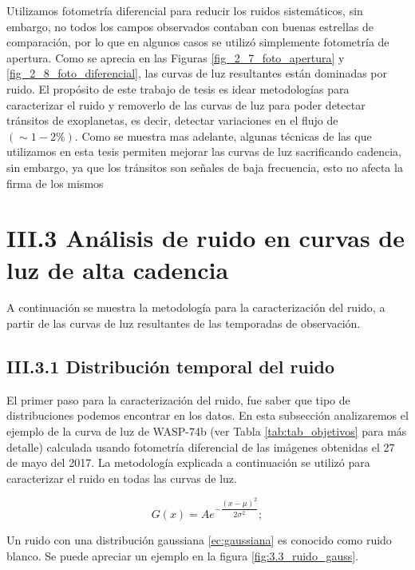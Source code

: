 Utilizamos fotometría diferencial para reducir los ruidos sistemáticos, sin embargo, no todos los campos observados contaban con buenas estrellas de comparación, por lo que en algunos casos se utilizó simplemente fotometría de apertura. Como se aprecia en las Figuras \ref{fig_2_7_foto_apertura} y \ref{fig_2_8_foto_diferencial}, las curvas de luz resultantes están dominadas por ruido. El propósito de este trabajo de tesis es idear metodologías para caracterizar el ruido y removerlo de las curvas de luz para poder detectar tránsitos de exoplanetas, es decir, detectar variaciones en el flujo de $(\sim 1-2 \%)$. Como se muestra mas adelante, algunas técnicas de las que utilizamos en esta tesis permiten mejorar las curvas de luz sacrificando cadencia, sin embargo, ya que los tránsitos son señales de baja frecuencia, esto no afecta la firma de los mismos

\section*{III.3 Análisis de ruido en curvas de luz de alta cadencia}

A continuación se muestra la metodología para la caracterización del ruido, a partir de las curvas de luz resultantes de las temporadas de observación.

\subsection*{III.3.1 Distribución temporal del ruido}

El primer paso para la caracterización del ruido, fue saber que tipo de distribuciones podemos encontrar en los datos. En esta subsección analizaremos el ejemplo de la curva de luz de WASP-74b (ver Tabla \ref{tab:tab_objetivos} para más detalle) calculada usando fotometría diferencial de las imágenes obtenidas el 27 de mayo del 2017. La metodología explicada a continuación se utiliz\'o para caracterizar el ruido en todas las curvas de luz.

\begin{equation}\label{ec:gaussiana}
  \displaystyle G(x)=Ae^{-\dfrac{(x-\mu)^{2}}{2\sigma^{2}}};
\end{equation}

Un ruido con una distribución gaussiana \ref{ec:gaussiana} es conocido como ruido blanco. Se puede apreciar un ejemplo en la figura \ref{fig:3.3_ruido_gauss}.

